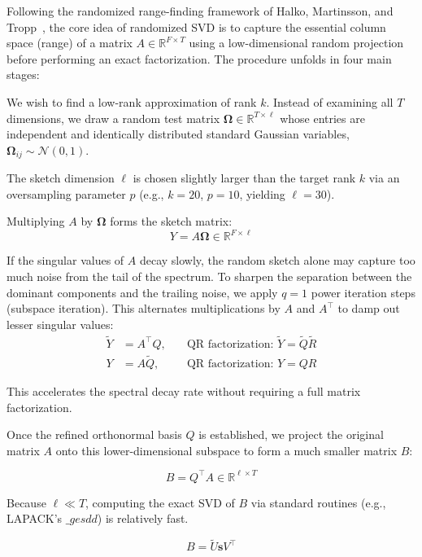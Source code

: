 \documentclass[11pt,a4paper]{article}
\theoremstyle{plain}
\theoremstyle{definition}
\theoremstyle{remark}
\begin{document}
Following the randomized range-finding framework of Halko, Martinsson,
and Tropp~\cite{Halko}, the core idea of randomized SVD is to capture the essential column space (range)
of a matrix $A \in \mathbb{R}^{F \times T}$ using a low-dimensional random projection before
performing an exact factorization. The procedure unfolds in four main stages:

We wish to find a low-rank approximation of rank $k$.
Instead of examining all $T$ dimensions, we draw a random test matrix
$\mathbf{\Omega} \in \mathbb{R}^{T \times \ell}$ whose entries are independent
and identically distributed standard Gaussian variables, $\mathbf{\Omega}_{ij} \sim \mathcal{N}(0, 1)$.

The sketch dimension $\ell$ is chosen slightly larger than
the target rank $k$ via an oversampling parameter $p$
(e.g., $k=20$, $p=10$, yielding $\ell = 30$).

Multiplying $A$ by $\mathbf{\Omega}$ forms the sketch matrix:
\begin{equation}
  Y = A\mathbf{\Omega} \in \mathbb{R}^{F \times \ell}
\end{equation}

If the singular values of $A$ decay slowly, the random sketch
alone may capture too much noise from the tail of the spectrum.
To sharpen the separation between the dominant components and the
trailing noise, we apply $q=1$ power iteration steps (subspace iteration).
This alternates multiplications by $A$ and $A^\top$ to damp out lesser singular values:
\begin{align}
  \tilde{Y} &= A^\top Q, \quad &\text{QR factorization: } \tilde{Y} = \tilde{Q} \tilde{R} \\
  Y &= A \tilde{Q}, \quad &\text{QR factorization: } Y = Q R
\end{align}

This accelerates the spectral decay rate without requiring a full matrix factorization.

Once the refined orthonormal basis $Q$ is established,
we project the original matrix $A$ onto this lower-dimensional subspace to form a much smaller matrix $B$:

\begin{equation}
  B = Q^\top A \in \mathbb{R}^{\ell \times T}
\end{equation}

Because $\ell \ll T$, computing the exact SVD of $B$ via
standard routines (e.g., LAPACK's $\_gesdd$) is relatively fast.

\begin{equation}
  B = \tilde{U} \mathbf{s} V^\top
\end{equation}
\end{document}
